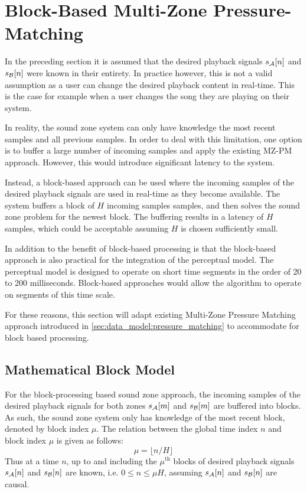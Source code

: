 \section{Block-Based Multi-Zone Pressure-Matching}
In the preceding section it is assumed that the desired playback signals $s_{\mathcal{A}}[n]$ and $s_{\mathcal{B}}[n]$ were known in their entirety.
In practice however, this is not a valid assumption as a user can change the desired playback content in real-time.
This is the case for example when a user changes the song they are playing on their system.

In reality, the sound zone system can only have knowledge the most recent samples and all previous samples.
In order to deal with this limitation, one option is to buffer a large number of incoming samples and apply the existing MZ-PM approach.
However, this would introduce significant latency to the system.

Instead, a block-based approach can be used where the incoming samples of the desired playback signals are used in real-time as they become available.
The system buffers a block of $H$ incoming samples samples, and then solves the sound zone problem for the newest block.
The buffering results in a latency of $H$ samples, which could be acceptable assuming $H$ is chosen sufficiently small. 

In addition to the benefit of block-based processing is that the block-based approach is also practical for the integration of the perceptual model.
The perceptual model is designed to operate on short time segments in the order of 20 to 200 milliseconds.
Block-based approaches would allow the algorithm to operate on segments of this time scale.

For these reasons, this section will adapt existing Multi-Zone Pressure Matching approach introduced in \autoref{sec:data_model:pressure_matching} 
to accommodate for block based processing.

\subsection{Mathematical Block Model}
For the block-processing based sound zone approach, the incoming samples of the desired playback signals for both zones $s_{\mathcal{A}}[m]$ and $s_{\mathcal{B}}[m]$ are buffered into blocks.
As such, the sound zone system only has knowledge of the most recent block, denoted by block index $\mu$.
The relation between the global time index $n$ and block index $\mu$ is given as follows:  
\begin{equation}
      \mu = \lfloor n / H \rfloor
\end{equation}
Thus at a time $n$, up to and including the $\mu^\text{th}$ blocks of desired playback signals $s_{\mathcal{A}}[n]$ and $s_{\mathcal{B}}[n]$ are known, i.e. $0\leq n\leq \mu H$, assuming $s_{\mathcal{A}}[n]$ and $s_{\mathcal{B}}[n]$ are causal.

